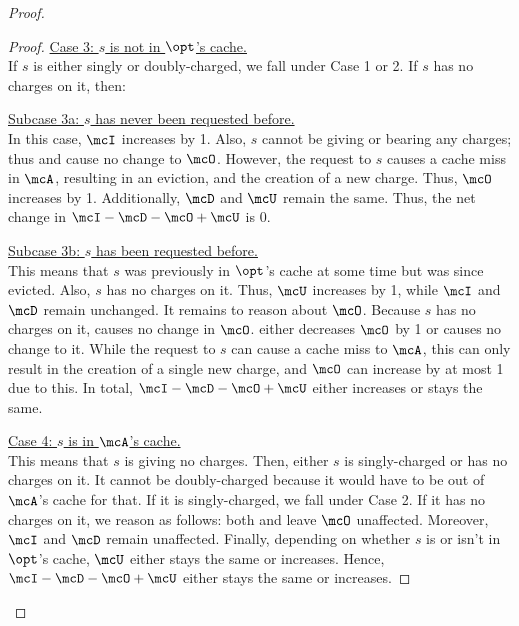 \begin{proof}
\begin{proof}
        \medskip\noindent\underline{Case 3: $s$ is not in $\opt$'s cache.} \\
        If $s$ is either singly or doubly-charged, we fall under Case 1 or 2. If $s$ has no charges on it, then:
        
        \smallskip         \noindent\underline{Subcase 3a: $s$ has never been requested before.} \\
        In this case, $\mcI$ increases by 1. Also, $s$ cannot be giving or bearing any charges; thus  and  cause no change to $\mcO$. However, the request to $s$ causes a cache miss in $\mcA$, resulting in an eviction, and the creation of a new charge. Thus, $\mcO$ increases by 1. Additionally, $\mcD$ and $\mcU$ remain the same. Thus, the net change in $\mcI - \mcD - \mcO + \mcU$ is 0.
        
        \smallskip         \noindent\underline{Subcase 3b: $s$ has been requested before.} \\
        This means that $s$ was previously in $\opt$'s cache at some time but was since evicted. Also, $s$ has no charges on it. Thus, $\mcU$ increases by 1, while $\mcI$ and $\mcD$ remain unchanged. It remains to reason about $\mcO$. Because $s$ has no charges on it,  causes no change in $\mcO$.
         either decreases $\mcO$ by 1 or causes no change to it.
        While the request to $s$ can cause a cache miss to $\mcA$, this can only result in the creation of a single new charge, and $\mcO$ can increase by at most 1 due to this. In total, $\mcI-\mcD-\mcO+\mcU$ either increases %
        or stays the same. 
        
        \medskip
        \noindent\underline{Case 4: $s$ is in $\mcA$'s cache.} \\
        This means that $s$ is giving no charges. Then, either $s$ is singly-charged or has no charges on it. It cannot be doubly-charged because it would have to be out of $\mcA$'s cache for that. If it is singly-charged, we fall under Case 2. If it has no charges on it, we reason as follows: both  and  leave $\mcO$ unaffected. Moreover, $\mcI$ and $\mcD$ remain unaffected. Finally, depending on whether $s$ is or isn't in $\opt$'s cache, $\mcU$ either stays the same or increases. Hence, $\mcI-\mcD-\mcO+\mcU$ either stays the same or increases. 
        

\end{proof}
\end{proof}
